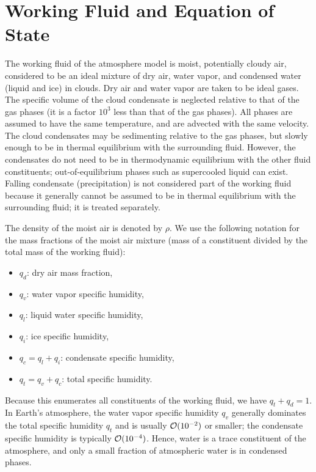 \documentclass{report}
\begin{document}
\section{Working Fluid and Equation of State}

The working fluid of the atmosphere model is moist, potentially cloudy air, considered to be an ideal mixture of dry air, water vapor, and condensed water (liquid and ice) in clouds. Dry air and water vapor are taken to be ideal gases. The specific volume of the cloud condensate is neglected relative to that of the gas phases (it is a  factor $10^{3}$ less than that of the gas phases). All phases are assumed to have the same temperature, and are advected with the same velocity. The cloud condensates may be sedimenting relative to the gas phases, but slowly enough to be in thermal equilibrium with the surrounding fluid. However, the condensates do not need to be in thermodynamic equilibrium with the other fluid constituents; out-of-equilibrium phases such as supercooled liquid can exist. Falling condensate (precipitation) is not considered part of the working fluid because it generally cannot be assumed to be in thermal equilibrium with the surrounding fluid; it is treated separately.

The density of the moist air is denoted by $\rho$. We use the following notation for the mass fractions of the moist air mixture (mass of a constituent divided by the total mass of the working fluid):
\begin{itemize}
\item $q_d$: dry air mass fraction,
\item $q_v$: water vapor specific humidity,
\item $q_l$: liquid water specific humidity,
\item $q_i$: ice specific humidity,
\item $q_c = q_l + q_i$: condensate specific humidity,
\item $q_t = q_v + q_c$: total specific humidity.
\end{itemize}
Because this enumerates all constituents of the working fluid, we have $q_t + q_d = 1$. In Earth's atmosphere, the water vapor specific humidity $q_v$ generally dominates the total specific humidity $q_t$ and is usually $\mathcal{O}(10^{-2})$ or smaller; the condensate specific humidity is typically $\mathcal{O}(10^{-4})$. Hence, water is a trace constituent of the atmosphere, and only a small fraction of atmospheric water is in condensed phases. 
\end{document}
